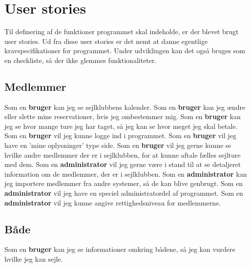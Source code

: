 \chapter{User stories}\label{User_stories}
Til definering af de funktioner programmet skal indeholde, er der blevet brugt user stories.
Ud fra disse user stories er det nemt at danne egentlige kravspecifikationer for programmet. 
Under udviklingen kan det også bruges som en checkliste, så der ikke glemmes funktionaliteter. 

\section{Medlemmer}
Som en \textbf{bruger} kan jeg se sejlklubbens kalender.
\newline
Som en \textbf{bruger} kan jeg ændre eller slette mine reservationer, hvis jeg ombestemmer mig.
\newline
Som en \textbf{bruger} kan jeg se hvor mange ture jeg har taget, så jeg kan se hvor meget jeg skal betale.
\newline
Som en \textbf{bruger} vil jeg kunne logge ind i programmet.
\newline
Som en \textbf{bruger} vil jeg have en 'mine oplysninger' type side. 
\newline
Som en \textbf{bruger} vil jeg gerne kunne se hvilke andre medlemmer der er i sejlklubben, for at kunne aftale fælles sejlture med dem.
\newline
Som en \textbf{administrator} vil jeg gerne være i stand til at se detaljeret information om de medlemmer, der er i sejlklubben.
\newline
Som en \textbf{administrator} kan jeg importere medlemmer fra andre systemer, så de kan blive genbrugt.
\newline
Som en \textbf{administrator} vil jeg have en speciel administratordel af programmet.
\newline
Som en \textbf{administrator} vil jeg kunne angive rettighedsniveau for medlemmerne.

\section{Både}

Som en \textbf{bruger} kan jeg se informationer omkring bådene, så jeg kan vurdere hvilke jeg kan sejle.

